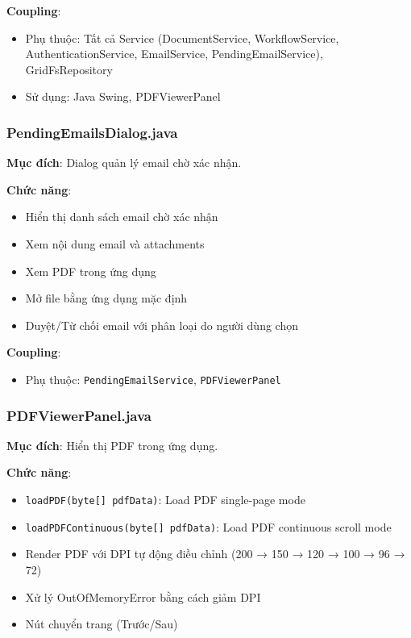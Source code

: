 \documentclass[12pt,a4paper]{article}
\begin{document}
\textbf{Coupling}:
\begin{itemize}
    \item Phụ thuộc: Tất cả Service (DocumentService, WorkflowService, AuthenticationService, EmailService, PendingEmailService), GridFsRepository
    \item Sử dụng: Java Swing, PDFViewerPanel
\end{itemize}

\subsubsection{PendingEmailsDialog.java}
\textbf{Mục đích}: Dialog quản lý email chờ xác nhận.

\textbf{Chức năng}:
\begin{itemize}
    \item Hiển thị danh sách email chờ xác nhận
    \item Xem nội dung email và attachments
    \item Xem PDF trong ứng dụng
    \item Mở file bằng ứng dụng mặc định
    \item Duyệt/Từ chối email với phân loại do người dùng chọn
\end{itemize}

\textbf{Coupling}:
\begin{itemize}
    \item Phụ thuộc: \texttt{PendingEmailService}, \texttt{PDFViewerPanel}
\end{itemize}

\subsubsection{PDFViewerPanel.java}
\textbf{Mục đích}: Hiển thị PDF trong ứng dụng.

\textbf{Chức năng}:
\begin{itemize}
    \item \texttt{loadPDF(byte[] pdfData)}: Load PDF single-page mode
    \item \texttt{loadPDFContinuous(byte[] pdfData)}: Load PDF continuous scroll mode
    \item Render PDF với DPI tự động điều chỉnh (200 → 150 → 120 → 100 → 96 → 72)
    \item Xử lý OutOfMemoryError bằng cách giảm DPI
    \item Nút chuyển trang (Trước/Sau)
\end{itemize}
\end{document}
